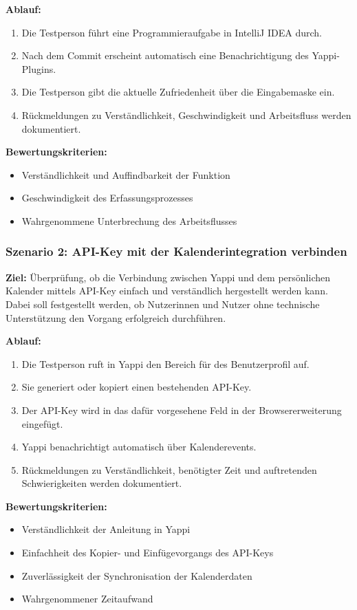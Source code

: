\documentclass[12pt,a4paper]{report}
\begin{document}
    \textbf{Ablauf:}
    \begin{enumerate}
        \item Die Testperson führt eine Programmieraufgabe in IntelliJ IDEA durch.
        \item Nach dem Commit erscheint automatisch eine Benachrichtigung des Yappi-Plugins.
        \item Die Testperson gibt die aktuelle Zufriedenheit über die Eingabemaske ein.
        \item Rückmeldungen zu Verständlichkeit, Geschwindigkeit und Arbeitsfluss werden dokumentiert.
    \end{enumerate}

    \textbf{Bewertungskriterien:}
    \begin{itemize}
        \item Verständlichkeit und Auffindbarkeit der Funktion
        \item Geschwindigkeit des Erfassungsprozesses
        \item Wahrgenommene Unterbrechung des Arbeitsflusses
    \end{itemize}

    \subsubsection{Szenario 2: API-Key mit der Kalenderintegration verbinden}
    \textbf{Ziel:} Überprüfung, ob die Verbindung zwischen Yappi und dem persönlichen Kalender mittels API-Key einfach
    und verständlich hergestellt werden kann. Dabei soll festgestellt werden, ob Nutzerinnen und Nutzer ohne technische
    Unterstützung den Vorgang erfolgreich durchführen.

    \textbf{Ablauf:}
    \begin{enumerate}
        \item Die Testperson ruft in Yappi den Bereich für des Benutzerprofil auf.
        \item Sie generiert oder kopiert einen bestehenden API-Key.
        \item Der API-Key wird in das dafür vorgesehene Feld in der Browsererweiterung eingefügt.
        \item Yappi benachrichtigt automatisch über Kalenderevents.
        \item Rückmeldungen zu Verständlichkeit, benötigter Zeit und auftretenden Schwierigkeiten werden dokumentiert.
    \end{enumerate}

    \textbf{Bewertungskriterien:}
    \begin{itemize}
        \item Verständlichkeit der Anleitung in Yappi
        \item Einfachheit des Kopier- und Einfügevorgangs des API-Keys
        \item Zuverlässigkeit der Synchronisation der Kalenderdaten
        \item Wahrgenommener Zeitaufwand
    \end{itemize}
\end{document}
